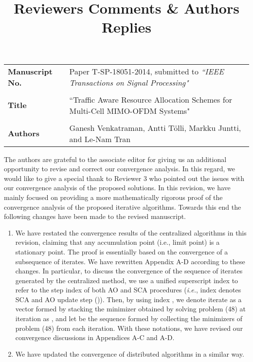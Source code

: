 \documentclass[10pt,letterpaper,onecolumn]{article}
\begin{document}
\title{Reviewers Comments \& Authors Replies}

\date{}
\maketitle

\begin{tabular}{p{1.25in}p{4.25in}}
	\textbf{Manuscript No.} & Paper T-SP-18051-2014, submitted to \emph{``IEEE Transactions on Signal Processing"} \\ \\
	\textbf{Title} & ``Traffic Aware Resource Allocation Schemes for Multi-Cell MIMO-OFDM Systems" \\ \\
	\textbf{Authors} & Ganesh Venkatraman, Antti T\"{o}lli, Markku Juntti, and Le-Nam Tran
\end{tabular}

\vspace{0.35in}
The authors are grateful to the associate editor for giving us an additional opportunity to revise and correct our convergence analysis. In this regard, we would like to give a special thank to Reviewer 3 who pointed out the issues with our convergence analysis of the proposed solutions. In this revision, we have mainly focused on providing a more mathematically rigorous  proof of the convergence analysis of the proposed iterative algorithms.
%
Towards this end the following changes have been made to the revised manuscript.
\begin{enumerate}
	\item We have restated the convergence results of the centralized algorithms in this revision, claiming that any accumulation point (i.e., limit point) is a stationary point. The proof is essentially based on the convergence of a subsequence of iterates. We have rewritten Appendix A-D according to these changes. In particular, to discuss the convergence of the sequence of iterates generated by the centralized method, we use a unified superscript index  to refer to the step index of both \ac{AO} and \ac{SCA} procedures (\textit{i.e.}, index  denotes \ac{SCA} and \ac{AO} update step ()). Then, by using index , we denote iterate  as a vector formed by stacking the minimizer obtained by solving problem (48) at iteration  as , and let  be the sequence formed by collecting the minimizers of problem (48) from each iteration. With these notations, we have revised our convergence discussions in Appendices A-C and A-D.		
	\item We have updated the convergence of distributed algorithms in a similar way.
\end{enumerate}
\end{document}
